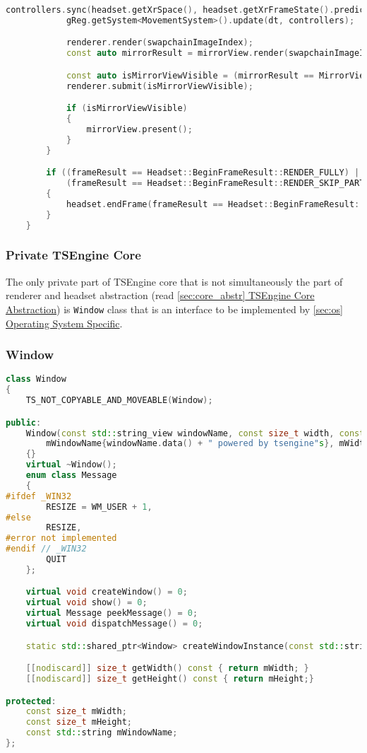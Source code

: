 \begin{lstlisting}[language=c++, caption=Engine main loop (./engine/src/core/core.cpp)]
            controllers.sync(headset.getXrSpace(), headset.getXrFrameState().predictedDisplayTime);
            gReg.getSystem<MovementSystem>().update(dt, controllers);

            renderer.render(swapchainImageIndex);
            const auto mirrorResult = mirrorView.render(swapchainImageIndex);

            const auto isMirrorViewVisible = (mirrorResult == MirrorView::RenderResult::VISIBLE);
            renderer.submit(isMirrorViewVisible);

            if (isMirrorViewVisible)
            {
                mirrorView.present();
            }
        }

        if ((frameResult == Headset::BeginFrameResult::RENDER_FULLY) ||
            (frameResult == Headset::BeginFrameResult::RENDER_SKIP_PARTIALLY))
        {
            headset.endFrame(frameResult == Headset::BeginFrameResult::RENDER_SKIP_PARTIALLY);
        }
    }
\end{lstlisting}

\newpage
\subsubsection{Private TSEngine Core}
The only private part of TSEngine core that is not simultaneously the part of renderer and headset abstraction (read \hyperref[sec:core_abstr]{\ref*{sec:core_abstr} TSEngine Core Abstraction}) is \texttt{Window} class that is an interface to be implemented by \hyperref[sec:os]{\ref*{sec:os} Operating System Specific}.
\subsubsection{Window}
\label{sec:window}

\begin{lstlisting}[language=c++, caption=Engine window interface (./engine/src/core/window.h)]
class Window
{
    TS_NOT_COPYABLE_AND_MOVEABLE(Window);

public:
    Window(const std::string_view windowName, const size_t width, const size_t height) :
        mWindowName{windowName.data() + " powered by tsengine"s}, mWidth{width}, mHeight{height}
    {}
    virtual ~Window();
    enum class Message
    {
#ifdef _WIN32
        RESIZE = WM_USER + 1,
#else
        RESIZE,
#error not implemented
#endif // _WIN32
        QUIT
    };

    virtual void createWindow() = 0;
    virtual void show() = 0;
    virtual Message peekMessage() = 0;
    virtual void dispatchMessage() = 0;

    static std::shared_ptr<Window> createWindowInstance(const std::string_view windowName, const size_t width, const size_t height);

    [[nodiscard]] size_t getWidth() const { return mWidth; }
    [[nodiscard]] size_t getHeight() const { return mHeight;}

protected:
    const size_t mWidth;
    const size_t mHeight;
    const std::string mWindowName;
};
\end{lstlisting}